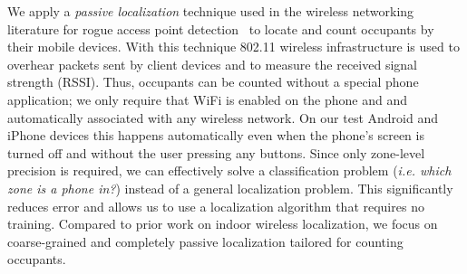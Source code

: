 We apply a {\it passive localization} technique used in the wireless networking literature for rogue access point detection~\cite{Faria2006, Laurendeau2010} to locate and count occupants by their mobile devices. With this technique 802.11 wireless infrastructure is used to overhear packets sent by client devices and to measure the received signal strength (RSSI). Thus, occupants can be counted without a special phone application; we only require that WiFi is enabled on the phone and and automatically associated with any wireless network. On our test Android and iPhone devices this happens automatically even when the phone's screen is turned off and without the user pressing any buttons. Since only zone-level precision is required, we can effectively solve a classification problem ({\it i.e. which zone is a phone in?}) instead of a general localization problem. This significantly reduces error and allows us to use a localization algorithm that requires no training. Compared to prior work on indoor wireless localization, we focus on coarse-grained and completely passive localization tailored for counting occupants.









